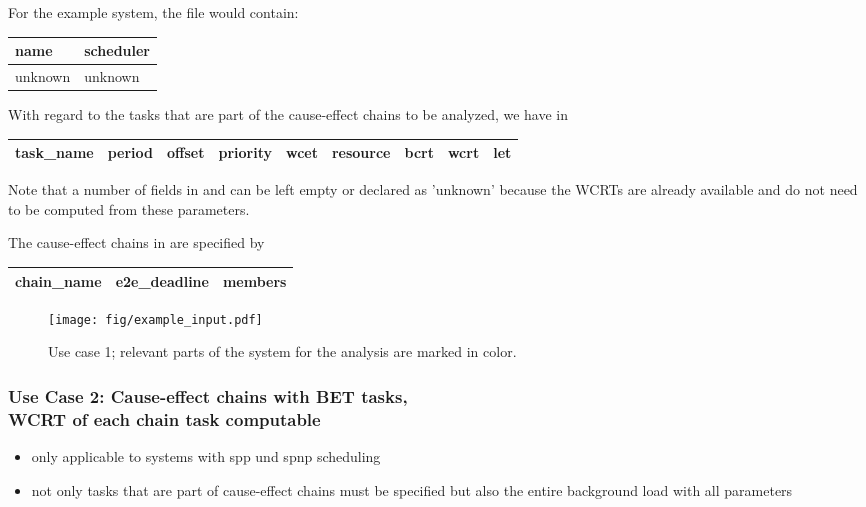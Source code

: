 For the example system, the file  would contain:
\begin{center}
	\begin{tabular}{|l|l|} \hline
		\textbf{name} & \textbf{scheduler} \\ \hline
		unknown & unknown \\ \hline
	\end{tabular}
\end{center}
With regard to the tasks that are part of the cause-effect chains to be analyzed, we have in  
\begin{center}
	\begin{tabular}{|l|l|l|l|l|l|l|l|l|} \hline
		  \textbf{task\_name}  
		& \textbf{period} 
		& \textbf{offset} 
		& \textbf{priority}
		& \textbf{wcet}
		& \textbf{resource} 
		& \textbf{bcrt}		
		& \textbf{wcrt}
		& \textbf{let} \\ \hline
	\end{tabular}
\end{center}
Note that a number of fields in  and  can be left empty or declared as 'unknown' because the WCRTs are already available and do not need to be computed from these parameters.
\bigskip

The cause-effect chains in  are specified by
\begin{center}
	\begin{tabular}{|l|l|l|l|l|} \hline
		\textbf{chain\_name} 
		& \textbf{e2e\_deadline}
		& \multicolumn{3}{|l|}{\textbf{members}} \\ \hline
	\end{tabular}
\end{center}
%
\begin{figure}[h!]
	\centering
		\texttt{[image: fig/example\_input.pdf]}
	\caption{Use case 1; relevant parts of the system for the analysis are marked in color.}
	\label{fig:use-case-1}
\end{figure}



\newpage
\subsubsection{Use Case 2: Cause-effect chains with BET tasks,\\ WCRT of each chain task computable}
\label{sec:input-files-bet2}

\begin{tcolorbox}
\begin{itemize}[leftmargin=*, itemsep=0pt]
	\item only applicable to systems with \ac{spp} und \ac{spnp} scheduling
	\item not only tasks that are part of cause-effect chains must be specified but also the entire background load with all parameters
\end{itemize}
\end{tcolorbox}

